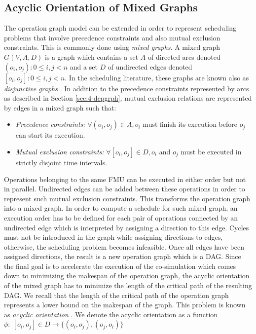 \subsection{Acyclic Orientation of Mixed Graphs}

The operation graph model can be extended in order to represent scheduling problems that involve precedence constraints and also mutual exclusion constraints. This is commonly done using \textit{mixed graphs}. A mixed graph $G(V,A,D)$ is a graph which contains a set $A$ of directed arcs denoted $(o_i,o_j): 0 \leq i, j < n$ and a set $D$ of undirected edges denoted $[o_i,o_j]: 0 \leq i, j < n$. In the scheduling literature, these graphs are known also as \textit{disjunctive graphs} \cite{balas:1969}. In addition to the precedence constraints represented by arcs as described in Section \ref{sec:4-depgrph}, mutual exclusion relations are represented by edges in a mixed graph such that: 
\begin{itemize}
\item \textit{Precedence constraints:} $\forall (o_i,o_j) \in A, o_i$ must finish its execution before $o_j$ can start its execution.  
\item \textit{Mutual exclusion constraints:} $\forall [o_i,o_j] \in D, o_i$ and $o_j$ must be executed in strictly disjoint time intervals.
\end{itemize}

Operations belonging to the same FMU can be executed in either order but not in parallel. Undirected edges can be added between these operations in order to represent such mutual exclusion constraints. This transforms the operation graph into a mixed graph. In order to compute a schedule for such mixed graph, an execution order has to be defined for each pair of operations connected by an undirected edge which is interpreted by assigning a direction to this edge. Cycles must not be introduced in the graph while assigning directions to edges, otherwise, the scheduling problem becomes infeasible. Once all edges have been assigned directions, the result is a new operation graph which is a DAG.
Since the final goal is to accelerate the execution of the co-simulation which comes down to minimizing the makespan of the operation graph, the acyclic orientation of the mixed graph has to minimize the length of the critical path of the resulting DAG. We recall that the length of the critical path of the operation graph represents a lower bound on the makespan of the graph. This problem is known as \textit{acyclic orientation} \cite{barbosa:1999}. We denote the acyclic orientation as a function $\phi:\ {[o_i,o_j] \in D} \rightarrow \{(o_i,o_j),(o_j,o_i)\}$

